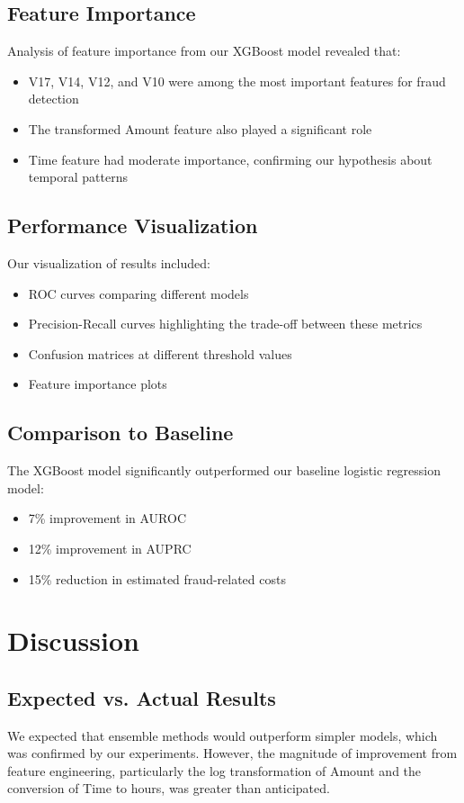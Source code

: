 \documentclass{article}
\begin{document}
\subsection{Feature Importance}
Analysis of feature importance from our XGBoost model revealed that:
\begin{itemize}
    \item V17, V14, V12, and V10 were among the most important features for fraud detection
    \item The transformed Amount feature also played a significant role
    \item Time feature had moderate importance, confirming our hypothesis about temporal patterns
\end{itemize}

\subsection{Performance Visualization}
Our visualization of results included:
\begin{itemize}
    \item ROC curves comparing different models
    \item Precision-Recall curves highlighting the trade-off between these metrics
    \item Confusion matrices at different threshold values
    \item Feature importance plots
\end{itemize}

\subsection{Comparison to Baseline}
The XGBoost model significantly outperformed our baseline logistic regression model:
\begin{itemize}
    \item 7\% improvement in AUROC
    \item 12\% improvement in AUPRC
    \item 15\% reduction in estimated fraud-related costs
\end{itemize}

\section{Discussion}
\subsection{Expected vs. Actual Results}
We expected that ensemble methods would outperform simpler models, which was confirmed by our experiments. However, the magnitude of improvement from feature engineering, particularly the log transformation of Amount and the conversion of Time to hours, was greater than anticipated.
\end{document}
